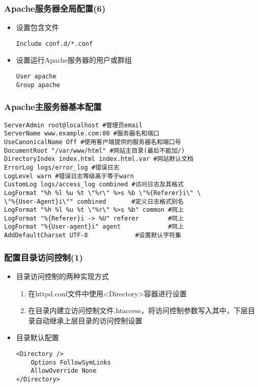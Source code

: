 \documentclass[xcolor=svgnames,presentation]{beamer}
\begin{document}
\begin{frame}[fragile]
\frametitle{Apache服务器全局配置(6)}
\label{sec-1-9}
\begin{itemize}

\item 设置包含文件\\
\label{sec-1-9-1}%
\begin{verbatim}
Include conf.d/*.conf
\end{verbatim}

\item 设置运行Apache服务器的用户或群组\\
\label{sec-1-9-2}%
\begin{verbatim}
User apache
Group apache
\end{verbatim}
\end{itemize} %
\end{frame}
\begin{frame}[fragile]
\frametitle{Apache主服务器基本配置}
\label{sec-1-10}


\begin{verbatim}
ServerAdmin root@localhost #管理员email
ServerName www.example.com:80 #服务器名和端口
UseCanonicalName Off #使用客户端提供的服务器名和端口号
DocumentRoot "/var/www/html" #网站主目录(最后不能加/)
DirectoryIndex index.html index.html.var #网站默认文档
ErrorLog logs/error_log #错误日志
LogLevel warn #错误日志等级高于等于warn
CustomLog logs/access_log combined #访问日志及其格式
LogFormat "%h %l %u %t \"%r\" %>s %b \"%{Referer}i\" \
\"%{User-Agent}i\"" combined       #定义日志格式别名
LogFormat "%h %l %u %t \"%r\" %>s %b" common #同上
LogFormat "%{Referer}i -> %U" referer        #同上
LogFormat "%{User-agent}i" agent             #同上
AddDefaultCharset UTF-8             #设置默认字符集
\end{verbatim}
\end{frame}
\begin{frame}[fragile]
\frametitle{配置目录访问控制(1)}
\label{sec-1-11}
\begin{itemize}

\item 目录访问控制的两种实现方式
\label{sec-1-11-1}%
\begin{enumerate}
\item 在httpd.conf文件中使用<Directory>容器进行设置
\item 在目录内建立访问控制文件.htaccess，将访问控制参数写入其中，下层目录自动继承上层目录的访问控制设置
\end{enumerate}

\item 目录默认配置\\
\label{sec-1-11-2}%
\begin{verbatim}
<Directory />
    Options FollowSymLinks
    AllowOverride None
</Directory>
\end{verbatim}
\end{itemize} %
\end{frame}
\end{document}
